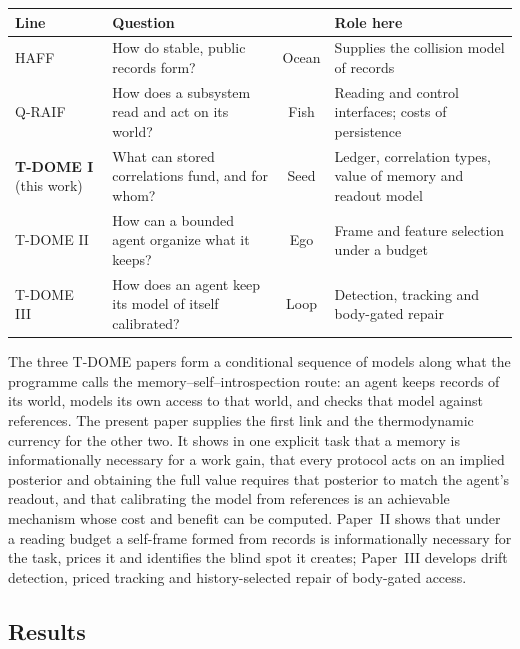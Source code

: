 \documentclass[12pt]{article}
\begin{document}
\begin{center}
\small
\setlength{\tabcolsep}{4pt}%
\begin{tabular}{@{}lP{3.4cm}cP{4.2cm}@{}}
\toprule
\textbf{Line} & \textbf{Question} & & \textbf{Role here} \\
\midrule
HAFF~\cite{Liu2026HAFF_E,Liu2026HAFF_F}
  & How do stable, public records form?
  & Ocean
  & Supplies the collision model of records \\[3pt]
Q-RAIF~\cite{Liu2026QRAIF_B}
  & How does a subsystem read and act on its world?
  & Fish
  & Reading and control interfaces; costs of persistence \\[3pt]
\textbf{T-DOME I} (this work)
  & What can stored correlations fund, and for whom?
  & Seed
  & Ledger, correlation types, value of memory and readout model \\[3pt]
T-DOME II~\cite{Liu2026TDOME_II}
  & How can a bounded agent organize what it keeps?
  & Ego
  & Frame and feature selection under a budget \\[3pt]
T-DOME III~\cite{Liu2026TDOME_III}
  & How does an agent keep its model of itself calibrated?
  & Loop
  & Detection, tracking and body-gated repair \\
\bottomrule
\end{tabular}
\end{center}

The three T-DOME papers form a conditional sequence of models along what the programme calls the memory--self--introspection route: an agent keeps records of its world, models its own access to that world, and checks that model against references. The present paper supplies the first link and the thermodynamic currency for the other two. It shows in one explicit task that a memory is informationally necessary for a work gain, that every protocol acts on an implied posterior and obtaining the full value requires that posterior to match the agent's readout, and that calibrating the model from references is an achievable mechanism whose cost and benefit can be computed. Paper~II shows that under a reading budget a self-frame formed from records is informationally necessary for the task, prices it and identifies the blind spot it creates; Paper~III develops drift detection, priced tracking and history-selected repair of body-gated access.

\subsection{Results}
\end{document}
